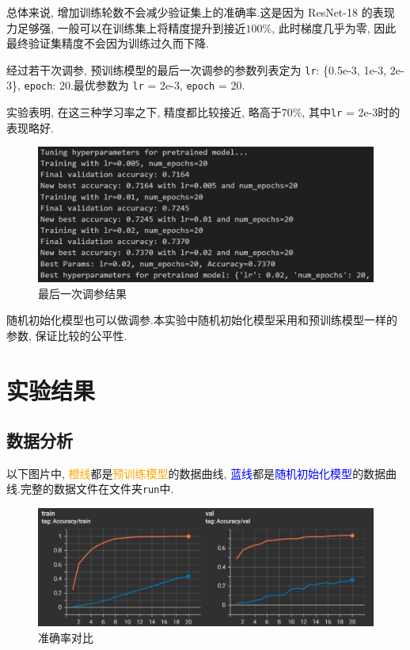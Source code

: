 \documentclass[notitlepage,cs4size,punct,oneside]{ctexrep}
\numberwithin{equation}{chapter}
\theoremstyle{mystyle}
\begin{document}
总体来说, 增加训练轮数不会减少验证集上的准确率.这是因为 ResNet-18 的表现力足够强, 一般可以在训练集上将精度提升到接近$100\%$, 此时梯度几乎为零, 因此最终验证集精度不会因为训练过久而下降.

经过若干次调参, 预训练模型的最后一次调参的参数列表定为 \texttt{lr}: \{0.5e-3, 1e-3, 2e-3\}, \texttt{epoch}: 20.最优参数为 \texttt{lr} = 2e-3, \texttt{epoch} = 20.

实验表明, 在这三种学习率之下, 精度都比较接近, 略高于$70\%$, 其中\texttt{lr} = 2e-3时的表现略好.

\begin{figure}[H]
    \centering
    \includegraphics[scale=0.7]{fine.png}
    \caption{最后一次调参结果}
    \label{fig:fine}
\end{figure}

随机初始化模型也可以做调参.本实验中随机初始化模型采用和预训练模型一样的参数, 保证比较的公平性.



\section{实验结果}
\subsection{数据分析}
以下图片中, \textcolor{orange}{橙线}都是\textcolor{orange}{预训练模型}的数据曲线, \textcolor{blue}{蓝线}都是\textcolor{blue}{随机初始化模型}的数据曲线.完整的数据文件在文件夹\texttt{run}中.

\begin{figure}[H]
    \centering
    \includegraphics[scale=0.75]{acc.png}
    \caption{准确率对比}
    \label{fig:acc}
\end{figure}
\end{document}
